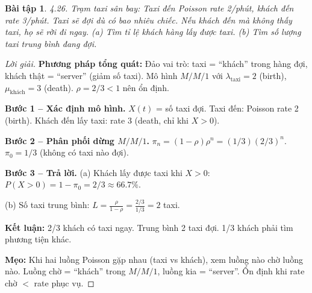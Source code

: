 \documentclass[8pt,a4paper]{article}
\newtheorem{exercise}{Bài tập}
\newenvironment{solution}{\begin{proof}[Lời giải]}{\end{proof}}
\begin{document}
\begin{exercise}
4.26. Trạm taxi sân bay: Taxi đến Poisson rate 2/phút, khách đến rate 3/phút. Taxi sẽ đợi dù có bao nhiêu chiếc. Nếu khách đến mà không thấy taxi, họ sẽ rời đi ngay.
(a) Tìm tỉ lệ khách hàng lấy được taxi. (b) Tìm số lượng taxi trung bình đang đợi.
\end{exercise}
\begin{solution}
\textbf{Phương pháp tổng quát:} Đảo vai trò: taxi = ``khách'' trong hàng đợi, khách thật = ``server'' (giảm số taxi). Mô hình $M/M/1$ với $\lambda_{\text{taxi}} = 2$ (birth), $\mu_{\text{khách}} = 3$ (death). $\rho = 2/3 < 1$ nên ổn định.

\textbf{Bước 1 -- Xác định mô hình.} $X(t)$ = số taxi đợi. Taxi đến: Poisson rate 2 (birth). Khách đến lấy taxi: rate 3 (death, chỉ khi $X > 0$).

\textbf{Bước 2 -- Phân phối dừng $M/M/1$.} $\pi_n = (1-\rho)\rho^n = (1/3)(2/3)^n$.
$\pi_0 = 1/3$ (không có taxi nào đợi).

\textbf{Bước 3 -- Trả lời.}
(a) Khách lấy được taxi khi $X > 0$: $P(X > 0) = 1 - \pi_0 = \boxed{2/3 \approx 66.7\%}$.

(b) Số taxi trung bình: $L = \frac{\rho}{1-\rho} = \frac{2/3}{1/3} = \boxed{2}$ taxi.

\textbf{Kết luận:} 2/3 khách có taxi ngay. Trung bình 2 taxi đợi. 1/3 khách phải tìm phương tiện khác.

\textbf{Mẹo:} Khi hai luồng Poisson gặp nhau (taxi vs khách), xem luồng nào chờ luồng nào. Luồng chờ = ``khách'' trong $M/M/1$, luồng kia = ``server''. Ổn định khi rate chờ $<$ rate phục vụ.
\end{solution}
\end{document}
